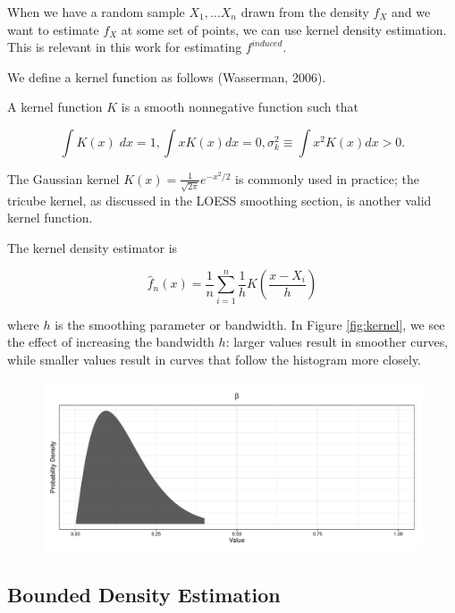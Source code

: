 \documentclass[12pt,twoside]{smiththesis}
\begin{document}
When we have a random sample \(X_1,\dots X_n\) drawn from the density \(f_X\) and we want to estimate \(f_X\) at some set of points, we can use kernel density estimation. This is relevant in this work for estimating \(f^{induced}\).

We define a kernel function as follows (Wasserman, 2006).
\begin{tcolorbox}[title=Definition: Kernel Function]

A kernel function $K$ is a smooth nonnegative function such that 

$$\int K(x) \; dx = 1, \int x K(x) dx = 0, \sigma^2_k \equiv \int x^2 K(x) dx > 0.$$ 
\end{tcolorbox}
The Gaussian kernel \(K(x) = \frac{1}{\sqrt{2\pi}}e^{-x^2/2}\) is commonly used in practice; the tricube kernel, as discussed in the LOESS smoothing section, is another valid kernel function.

The kernel density estimator is

\[\hat f_n(x) = \frac 1n \sum_{i=1}^n \frac 1h K\left(\dfrac{x-X_i}{h} \right)\]

where \(h\) is the smoothing parameter or bandwidth. In Figure \ref{fig:kernel}, we see the effect of increasing the bandwidth \(h\): larger values result in smoother curves, while smaller values result in curves that follow the histogram more closely.
\begin{figure}

{\centering \includegraphics[width=1\linewidth]{thesis_files/figure-latex/unnamed-chunk-36-1} 

}

\caption{\label{fig:kernel}}\label{fig:unnamed-chunk-36}
\end{figure}
\hypertarget{bounded-density-estimation}{%
\subsection{Bounded Density Estimation}\label{bounded-density-estimation}}
\end{document}
